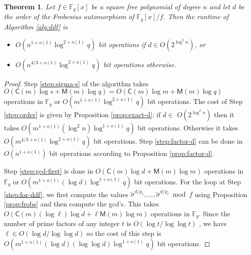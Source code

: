 \documentclass[11pt]{article}
\theoremstyle{plain}
\newtheorem{theorem}{Theorem}
\theoremstyle{definition}
\def\F{\ensuremath{\mathbb{F}}}
\def\MM{\ensuremath{\mathsf{M}}}
\def\CC{\ensuremath{\mathsf{C}}}
\begin{document}
\begin{theorem}\label{thm:alg-ddf}
	Let $f \in \F_q[x]$ be a square free polynomial of degree $n$ and let $d$ be the order of the 
	Frobenius automorphism of $\F_q[x] / f$. Then the runtime of Algorithm \ref{alg:ddf} is
	\begin{itemize}
		\item $O(n^{1 + o(1)} \log^{2 + o(1)}q)$ bit operations if $d \in O(2^{\log^2n})$, or
		\item $O(n^{4 / 3 + o(1)} \log^{2 + o(1)}q)$ bit operations otherwise.
	\end{itemize}
\end{theorem}
\begin{proof}
	Step \ref{step:sigma-s} of the algorithm takes $O(\CC(m)\log s + \MM(m)\log q) = O(\CC(m)\log m 
	+ \MM(m)\log q)$ operations in $\F_q$ or $O(m^{1 + o(1)}\log^{2 + o(1)}q)$ bit operations. The 
	cost of Step \ref{step:order} is given by Proposition \ref{prop:exact-d}: if $d \in $ 
	$O(2^{\log^2n})$ then it takes $O(m^{1 + o(1)} (\log^2n) \log^{1 + o(1)}q)$ bit operations. 
	Otherwise it takes $O(m^{4 / 3 + o(1)} \log^{2 + o(1)}q)$ bit operations. Step 
	\ref{step:factor-d} can be done in $O(n^{1 + o(1)})$ bit operations according to Proposition 
	\ref{prop:factor-d}. 
	
	Step \ref{step:gcd-first} is done in $O(\CC(m)\log d + \MM(m)\log m)$ operations in $\F_q$ 
	or $O(m^{1 + o(1)}(\log d)\log^{1 + o(1)}q)$ bit operations. For the loop at Step 
	\ref{step:for-ddf}, we first compute the values $\tilde{\sigma}^{d / p_1}, \dots, 
	\tilde{\sigma}^{d / p_\ell} \bmod f$ using Proposition \ref{prop:frobs} and then compute the 
	gcd's. This takes $O(\CC(m)(\log \ell)\log d + \ell\MM(m)\log m)$ operations in $\F_q$. Since 
	the number of prime factors of any integer $t$ is $O(\log t / \log\log t)$ 
	\cite{hardy1979introduction}, we have $\ell \in O(\log d / \log\log d)$ so the cost of this 
	step is $O(m^{1 + o(1)}(\log d)(\log \log d)\log^{1 + o(1)}q)$ bit operations.
	

\end{proof}
\end{document}
